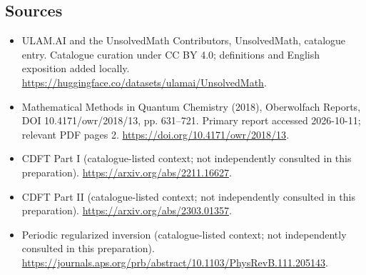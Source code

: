 \documentclass[11pt]{article}
\begin{document}
\subsection{Sources}
\begin{itemize}
\item[\hypertarget{source:statement:1}{S1}] ULAM.AI and the UnsolvedMath Contributors, UnsolvedMath, catalogue entry. Catalogue curation under CC BY 4.0; definitions and English exposition added locally.
\url{https://huggingface.co/datasets/ulamai/UnsolvedMath}.
\item[\hypertarget{source:statement:2}{S2}] Mathematical Methods in Quantum Chemistry (2018), Oberwolfach Reports, DOI 10.4171/owr/2018/13, pp. 631--721. Primary report accessed 2026-10-11; relevant PDF pages 2.
\url{https://doi.org/10.4171/owr/2018/13}.
\item[\hypertarget{source:statement:3}{S3}] CDFT Part I (catalogue-listed context; not independently consulted in this preparation).
\url{https://arxiv.org/abs/2211.16627}.
\item[\hypertarget{source:statement:4}{S4}] CDFT Part II (catalogue-listed context; not independently consulted in this preparation).
\url{https://arxiv.org/abs/2303.01357}.
\item[\hypertarget{source:statement:5}{S5}] Periodic regularized inversion (catalogue-listed context; not independently consulted in this preparation).
\url{https://journals.aps.org/prb/abstract/10.1103/PhysRevB.111.205143}.
\end{itemize}
\label{end:statement}
\end{document}
